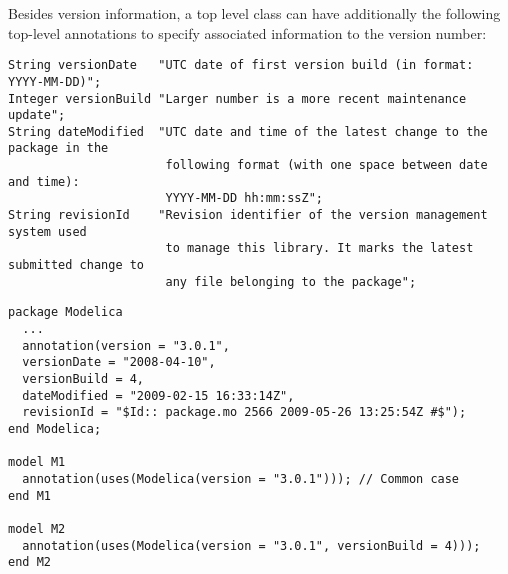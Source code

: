 Besides version information, a top level class can have additionally the
following top-level annotations to specify associated information to the
version number:
\begin{lstlisting}[language=modelica]
String versionDate   "UTC date of first version build (in format: YYYY-MM-DD)";
Integer versionBuild "Larger number is a more recent maintenance update";
String dateModified  "UTC date and time of the latest change to the package in the
                      following format (with one space between date and time):
                      YYYY-MM-DD hh:mm:ssZ";
String revisionId    "Revision identifier of the version management system used
                      to manage this library. It marks the latest submitted change to
                      any file belonging to the package";
\end{lstlisting}

\begin{example}
\begin{lstlisting}[language=modelica,mathescape=false]
package Modelica
  ...
  annotation(version = "3.0.1",
  versionDate = "2008-04-10",
  versionBuild = 4,
  dateModified = "2009-02-15 16:33:14Z",
  revisionId = "$Id:: package.mo 2566 2009-05-26 13:25:54Z #$");
end Modelica;

model M1
  annotation(uses(Modelica(version = "3.0.1"))); // Common case
end M1

model M2
  annotation(uses(Modelica(version = "3.0.1", versionBuild = 4)));
end M2
\end{lstlisting}
\end{example}

